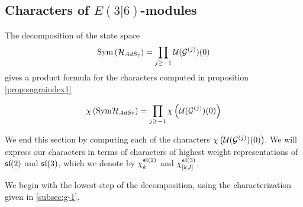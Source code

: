 \documentclass[../main.tex]{subfiles}
\begin{document}
\subsection{Characters of $E(3|6)$-modules}\label{e36char}
The decomposition of the state space 
\[
\text{Sym} \left (\mathcal{H}_{AdS_7}\right ) = \prod_{j\geq -1} \mathcal{U} (\mathcal{G}^{(j)})(0) 
\] 
gives a product formula for the characters computed in proposition \ref{prop:sugraindex1}

\[ \chi \left ( \text{Sym} \mathcal{H}_{AdS_7} \right ) = \prod_{j\geq -1} \chi \left (\mathcal{U} (\mathcal{G}^{(j)})(0) \right ) \]

We end this section by computing each of the characters $\chi \left (\mathcal{U} (\mathcal{G}^{(j)})(0) \right )$. We will express our characters in terms of characters of highest weight representations of $\mathfrak{sl}(2)$ and $\mathfrak{sl}(3)$, which we denote by $\chi_k^{\mathfrak{sl}(2)}$ and $\chi^{\mathfrak{sl}(3)}_{[k,l]}$.

\parsec[]
We begin with the lowest step of the decomposition, using the characterization given in \ref{subsec:g-1}. 
\end{document}
